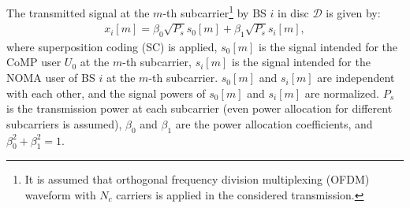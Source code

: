 \documentclass[10pt, doublecolumn]{IEEEtran}
\begin{document}
{\color{black}The transmitted signal {\color{black}at the $m$-th subcarrier}{\footnote{{\color{black}It is assumed that orthogonal frequency division multiplexing (OFDM) waveform with $N_c$ carriers is applied in the considered transmission.}}} by BS $i$ in disc $\mathcal{D}$ is given by:
\begin{align}
  x_i[m]=\beta_0\sqrt{P_s}s_0[m]+\beta_1\sqrt{P_s}s_i[m],
\end{align}
where superposition coding (SC) is applied, $s_0[m]$ is the signal intended for the CoMP user $U_0$ at the $m$-th subcarrier, $s_i[m]$ is the signal intended for the NOMA user of BS $i$ at the $m$-th subcarrier. $s_0[m]$ and $s_i[m]$ are independent with each other, and the signal powers of $s_0[m]$ and $s_i[m]$ are normalized. $P_s$ is the transmission power at each subcarrier (even power allocation for different subcarriers is assumed), $\beta_0$ and $\beta_1$ are the power allocation coefficients,
and $\beta_0^2+\beta_1^2=1$.

}
\end{document}
